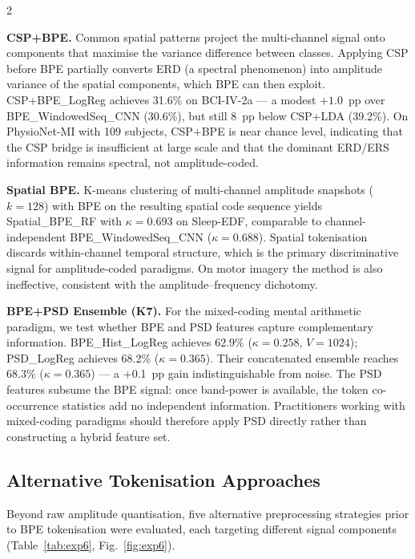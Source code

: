 \documentclass[14pt,a4paper]{extarticle}
\begin{document}
\begin{multicols}{2}

\textbf{CSP+BPE.}
Common spatial patterns project the multi-channel signal onto
components that maximise the variance difference between classes.
Applying CSP before BPE partially converts ERD
(a spectral phenomenon) into amplitude variance of the spatial
components, which BPE can then exploit.
CSP+BPE\_LogReg achieves 31.6\% on BCI-IV-2a --- a modest $+1.0$~pp
over BPE\_WindowedSeq\_CNN (30.6\%), but still 8~pp below
CSP+LDA (39.2\%).
On PhysioNet-MI with 109 subjects, CSP+BPE is near chance level,
indicating that the CSP bridge is insufficient at large scale and
that the dominant ERD/ERS information remains spectral, not
amplitude-coded.

\textbf{Spatial BPE.}
K-means clustering of multi-channel amplitude snapshots ($k{=}128$)
with BPE on the resulting spatial code sequence
yields Spatial\_BPE\_RF with $\kappa{=}0.693$ on Sleep-EDF,
comparable to channel-independent BPE\_WindowedSeq\_CNN ($\kappa{=}0.688$).
Spatial tokenisation discards within-channel temporal structure,
which is the primary discriminative signal for amplitude-coded paradigms.
On motor imagery the method is also ineffective, consistent with
the amplitude--frequency dichotomy.

\textbf{BPE+PSD Ensemble (K7).}
For the mixed-coding mental arithmetic paradigm, we test whether
BPE and PSD features capture complementary information.
BPE\_Hist\_LogReg achieves 62.9\% ($\kappa{=}0.258$, $V{=}1024$);
PSD\_LogReg achieves 68.2\% ($\kappa{=}0.365$).
Their concatenated ensemble reaches 68.3\% ($\kappa{=}0.365$) ---
a +0.1~pp gain indistinguishable from noise.
The PSD features subsume the BPE signal: once band-power is
available, the token co-occurrence statistics add no independent
information.
Practitioners working with mixed-coding paradigms should therefore
apply PSD directly rather than constructing a hybrid feature set.

\subsection*{Alternative Tokenisation Approaches}

Beyond raw amplitude quantisation, five alternative preprocessing
strategies prior to BPE tokenisation were evaluated,
each targeting different signal components
(Table~\ref{tab:exp6}, Fig.~\ref{fig:exp6}).


\end{multicols}
\end{document}
